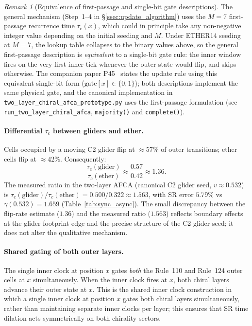 \documentclass[11pt]{article}
\theoremstyle{remark}
\newtheorem{remark}[theorem]{Remark}
\begin{document}
\begin{remark}[Equivalence of first-passage and single-bit gate descriptions]
\label{rem:tauc_equiv}
The general mechanism (Step~1--4 in \S\ref{ssec:update_algorithm}) uses the
$M=7$ first-passage recurrence time $\tau_c(x)$, which could in principle take
any non-negative integer value depending on the initial seeding and $M$.
Under ETHER14 seeding at $M=7$, the lookup table collapses to the binary values
above, so the general first-passage description is \emph{equivalent} to a
single-bit gate rule: the inner window fires on the very first inner tick
whenever the outer state would flip, and skips otherwise.
The companion paper P45~\cite{SpivackThreeTapeCMCA} states the update rule
using this equivalent single-bit form ($\mathrm{gate}[x]\in\{0,1\}$);
both descriptions implement the same physical gate, and the canonical
implementation in \texttt{two\_layer\_chiral\_afca\_prototype.py} uses the
first-passage formulation (see \texttt{run\_two\_layer\_chiral\_afca},
\texttt{majority()} and \texttt{complete()}).
\end{remark}

\paragraph{Differential $\tau_c$ between gliders and ether.}
Cells occupied by a moving C2 glider flip at $\approx57\%$ of outer
transitions; ether cells flip at $\approx42\%$.  Consequently:
\begin{equation}
  \label{eq:tauc_ratio}
  \frac{\tau_c(\mathrm{glider})}{\tau_c(\mathrm{ether})} \approx
  \frac{0.57}{0.42} \approx 1.36.
\end{equation}
The measured ratio in the two-layer AFCA (canonical C2 glider seed,
$v\approx0.532$) is $\tau_c(\mathrm{glider})/\tau_c(\mathrm{ether})
= 0.500/0.322 \approx 1.563$, with SR error $5.79\%$
vs $\gamma(0.532)=1.659$ (Table~\ref{tab:sync_async}).
The small discrepancy between the flip-rate estimate ($1.36$) and the
measured ratio ($1.563$) reflects boundary effects at the glider footprint
edge and the precise structure of the C2 glider seed; it does not alter the
qualitative mechanism.

\paragraph{Shared gating of both outer layers.}
The single inner clock at position $x$ gates \emph{both} the Rule~110
and Rule~124 outer cells at $x$ simultaneously.  When the inner clock fires
at $x$, both chiral layers advance their outer state at $x$.  This is the
shared inner clock construction in which a single inner clock at position $x$
gates both chiral layers simultaneously, rather than maintaining separate inner
clocks per layer; this ensures that SR time dilation acts symmetrically on
both chirality sectors.
\end{document}
